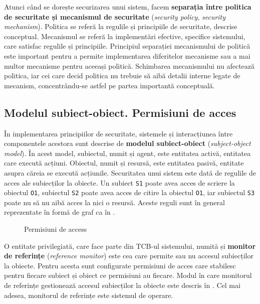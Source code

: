 Atunci când se dorește securizarea unui sistem, facem \textbf{separația între politica de securitate și mecanismul de securitate} (\textit{security policy}, \textit{security mechanism}).
Politica se referă la regulile și principiile de securitate, descrise conceptual.
Mecanismul se referă la implementări efective, specifice sistemului, care satisfac regulile și principiile.
Principiul separației mecanismului de politică este important pentru a permite implementarea diferitelor mecanisme sau a mai multor mecanisme pentru aceeași politică.
Schimbarea mecanismului nu afectează politica, iar cei care decid politica nu trebuie să aibă detalii interne legate de mecanism, concentrându-se astfel pe partea importantă conceptuală.

\subsection{Modelul subiect-obiect.
Permisiuni de acces}
\label{sec:sec:fundamentals:permissions}

În implementarea principiilor de securitate, sistemele și interacțiunea între componentele acestora sunt descrise de \textbf{modelul subiect-obiect} (\textit{subject-object model}).
În acest model, subiectul, numit și agent, este entitatea activă, entitatea care execută acțiuni.
Obiectul, numit și resursă, este entitatea pasivă, entitate asupra căreia se execută acțiunile.
Securitatea unui sistem este dată de regulile de acces ale subiecților la obiecte.
Un subiect \texttt{S1} poate avea acces de scriere la obiectul \texttt{O1}, subiectul \texttt{S2} poate avea acces de citire la obiectul \texttt{O1}, iar subiectul \texttt{S3} poate nu să nu aibă acces la nici o resursă.
Aceste reguli sunt în general reprezentate în formă de graf ca în .

\begin{figure}[htbp]
  \centering
  \def\svgwidth{\columnwidth}
  
  \caption{Permisiuni de access}
  \label{fig:sec:access-permissions}
\end{figure}

O entitate privilegiată, care face parte din TCB-ul sistemului, numită și \textbf{monitor de referințe} (\textit{reference monitor}) este cea care permite sau nu accesul subiecților la obiecte.
Pentru acesta sunt configurate permisiuni de acces care stabilesc pentru fiecare subiect și obiect ce permisiuni au fiecare.
Modul în care monitorul de referințe gestionează accesul subiecților la obiecte este descris în .
Cel mai adesea, monitorul de referințe este sistemul de operare.

